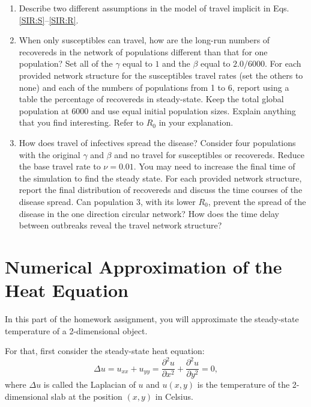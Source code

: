 \documentclass[letter]{article}
\begin{document}
\begin{enumerate}[label=\textbf{\arabic*.}]
	\item Describe two different assumptions in the model of travel implicit in Eqs. \eqref{SIR:S}--\eqref{SIR:R}.

	\item When only susceptibles can travel, how are the long-run numbers of recovereds in the network of populations different than that for one population? Set all of the $\gamma$ equal to $1$ and the $\beta$ equal to $2.0/6000$. For each provided network structure for the susceptibles travel rates (set the others to none) and each of the numbers of populations from 1 to 6, report using a table the percentage of recovereds in steady-state. Keep the total global population at 6000 and use equal initial population sizes. Explain anything that you find interesting. Refer to $R_0$ in your explanation.
		
	\item How does travel of infectives spread the disease? Consider four populations with the original $\gamma$ and $\beta$ and no travel for susceptibles or recovereds. Reduce the base travel rate to $\nu = 0.01$. You may need to increase the final time of the simulation to find the steady state. For each provided network structure, report the final distribution of recovereds and discuss the time courses of the disease spread. Can population 3, with its lower $R_0$, prevent the spread of the disease in the one direction circular network? How does the time delay between outbreaks reveal the travel network structure?
	


	
	
\end{enumerate}

\newpage

\section{Numerical Approximation of the Heat Equation}

In this part of the homework assignment, you will approximate the steady-state temperature of a 2-dimensional object.

For that, first consider the steady-state heat equation:
\begin{equation}\tag{Heat Equation}\label{HeatEq}
	\Delta u = u_{xx} + u_{yy} = \frac{\partial^2 u}{\partial x^2} + \frac{\partial^2 u}{\partial y^2} = 0,
\end{equation}
where $\Delta u$ is called the Laplacian of $u$ and $u(x,y)$ is the temperature of the 2-dimensional slab at the position $(x,y)$ in Celsius.
\end{document}
